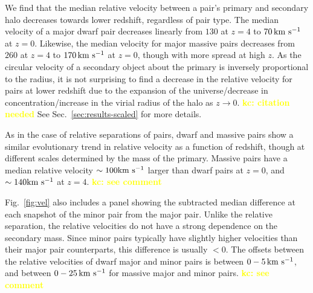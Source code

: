 \documentclass[twocolumn]{aastex631}
\newcommand{\kc}[1]{\textcolor{yellow}{\textbf{kc: #1}} }
\begin{document}
    We find that the median relative velocity between a pair's primary and secondary halo decreases towards lower redshift, regardless of pair type.
    The median velocity of a major dwarf pair decreases linearly from $130$ at $z=4$ to $70\,\mathrm{km}~\mathrm{s}^{-1}$ at $z=0$. Likewise, the median velocity for major massive pairs decreases from $260$ at $z=4$ to $170\,\mathrm{km}~\mathrm{s}^{-1}$ at $z=0$, though with more spread at high $z$.
    As the circular velocity of a secondary object about the primary is inversely proportional to the radius, it is not surprising to find a decrease in the relative velocity for pairs at lower redshift due to the expansion of the universe/decrease in concentration/increase in the virial radius of the halo as $z\to0$. \kc{citation needed}
    See Sec.~\ref{sec:results-scaled} for more details.
    
    As in the case of relative separations of pairs, dwarf and massive pairs show a similar evolutionary trend in relative velocity as a function of redshift, though at different scales determined by the mass of the primary.
    Massive pairs have a median relative velocity $\sim100\mathrm{km}~\mathrm{s}^{-1}$ larger than dwarf pairs at $z=0$, and $\sim140\mathrm{km}~\mathrm{s}^{-1}$ at $z=4$. \kc{see comment}

    Fig.~\ref{fig:vel} also includes a panel showing the subtracted median difference at each snapshot of the minor pair from the major pair. Unlike the relative separation, the relative velocities do not have a strong dependence on the secondary mass. 
    Since minor pairs typically have slightly higher velocities than their major pair counterparts, this difference is usually $<0$. The offsets between the relative velocities of dwarf major and minor pairs is between $0-5\,\mathrm{km}~\mathrm{s}^{-1}$, and between $0-25\,\mathrm{km}~\mathrm{s}^{-1}$ for massive major and minor pairs. \kc{see comment} %
    
\end{document}
